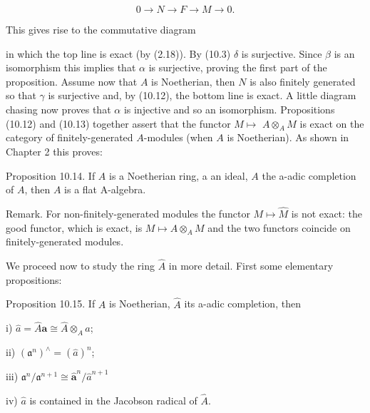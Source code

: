 \documentclass{standalone}
\theoremstyle{definition}
\theoremstyle{remark}
\begin{document}
\[
0 \rightarrow N \rightarrow F \rightarrow M \rightarrow 0 .
\]

This gives rise to the commutative diagram

\begin{center}
\end{center}

in which the top line is exact (by (2.18)). By (10.3) $\delta$ is surjective. Since $\beta$ is an isomorphism this implies that $\alpha$ is surjective, proving the first part of the proposition. Assume now that $A$ is Noetherian, then $N$ is also finitely generated so that $\gamma$ is surjective and, by (10.12), the bottom line is exact. A little diagram chasing now proves that $\alpha$ is injective and so an isomorphism. Propositions (10.12) and (10.13) together assert that the functor $M \mapsto$ $A \otimes_{A} M$ is exact on the category of finitely-generated $A$-modules (when $A$ is Noetherian). As shown in Chapter 2 this proves:

Proposition 10.14. If $A$ is a Noetherian ring, a an ideal, $A$ the a-adic completion of $A$, then $A$ is a flat A-algebra.

Remark. For non-finitely-generated modules the functor $M \mapsto \hat{M}$ is not exact: the good functor, which is exact, is $M \mapsto A \otimes_{A} M$ and the two functors coincide on finitely-generated modules.

We proceed now to study the ring $\hat{A}$ in more detail. First some elementary propositions:

Proposition 10.15. If $A$ is Noetherian, $\hat{A}$ its a-adic completion, then

i) $\hat{a}=\hat{A} \mathbf{a} \cong \hat{A} \otimes_{A} a$;

ii) $\left(\mathfrak{a}^{n}\right)^{\wedge}=(\hat{a})^{n}$;

iii) $\mathfrak{a}^{n} / \mathfrak{a}^{n+1} \cong \hat{\mathbf{a}}^{n} / \hat{a}^{n+1}$

iv) $\hat{a}$ is contained in the Jacobson radical of $\hat{A}$.
\end{document}
